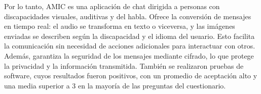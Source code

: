\documentclass[lettersize,journal]{IEEEtran}
\begin{document}
\noindent Por lo tanto, AMIC es una aplicación de chat dirigida a personas con discapacidades visuales, auditivas y del habla. Ofrece la conversión de mensajes en tiempo real: el audio se transforma en texto o viceversa, y las imágenes enviadas se describen según la discapacidad y el idioma del usuario. Esto facilita la comunicación sin necesidad de acciones adicionales para interactuar con otros. Además, garantiza la seguridad de los mensajes mediante cifrado, lo que protege la privacidad y la información transmitida. También se realizaron pruebas de software, cuyos resultados fueron positivos, con un promedio de aceptación alto y una media superior a 3 en la mayoría de las preguntas del cuestionario.

\nocite{*}


\end{document}

